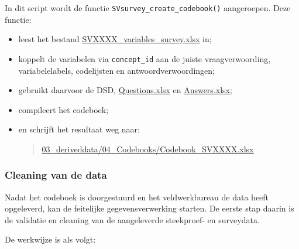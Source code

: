 \documentclass{VSAnote}
\begin{document}
\begin{enumerate}
In dit script wordt de functie \verb+SVsurvey_create_codebook()+ aangeroepen. Deze functie:
\begin{itemize}
\item leest het bestand \url{SVXXXX_variables_survey.xlsx} in;
\item koppelt de variabelen via \verb+concept_id+ aan de juiste vraagverwoording, variabelelabels, codelijsten en antwoordverwoordingen;
\item gebruikt daarvoor de DSD, \url{Questions.xlsx} en \url{Answers.xlsx};
\item compileert het codeboek;
\item en schrijft het resultaat weg naar:
\begin{quote}
\url{03_deriveddata/04_Codebooks/Codebook_SVXXXX.xlsx}
\end{quote}
\end{itemize}

\end{enumerate}

\subsubsection{Cleaning van de data}
\label{sec:cleaning}

Nadat het codeboek is doorgestuurd en het veldwerkbureau de data heeft opgeleverd, kan de feitelijke gegevensverwerking starten. De eerste stap daarin is de validatie en cleaning van de aangeleverde steekproef- en surveydata.

De werkwijze is als volgt:
\end{document}
